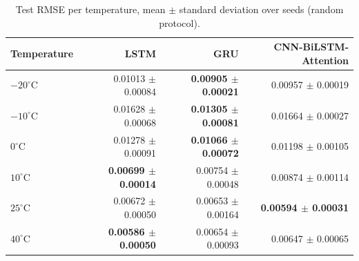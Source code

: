 \begin{table}[t]
\centering
\caption{Test RMSE per temperature, mean $\pm$ standard deviation over seeds (random protocol).}
\label{tab:rmse_temperature_seeds_random}
\begin{tabular}{lrrr}
\toprule
Temperature & LSTM & GRU & CNN-BiLSTM-Attention \\
\midrule
$-20^{\circ}$C & 0.01013 $\pm$ 0.00084 & \textbf{0.00905 $\pm$ 0.00021} & 0.00957 $\pm$ 0.00019 \\
$-10^{\circ}$C & 0.01628 $\pm$ 0.00068 & \textbf{0.01305 $\pm$ 0.00081} & 0.01664 $\pm$ 0.00027 \\
$0^{\circ}$C & 0.01278 $\pm$ 0.00091 & \textbf{0.01066 $\pm$ 0.00072} & 0.01198 $\pm$ 0.00105 \\
$10^{\circ}$C & \textbf{0.00699 $\pm$ 0.00014} & 0.00754 $\pm$ 0.00048 & 0.00874 $\pm$ 0.00114 \\
$25^{\circ}$C & 0.00672 $\pm$ 0.00050 & 0.00653 $\pm$ 0.00164 & \textbf{0.00594 $\pm$ 0.00031} \\
$40^{\circ}$C & \textbf{0.00586 $\pm$ 0.00050} & 0.00654 $\pm$ 0.00093 & 0.00647 $\pm$ 0.00065 \\
\bottomrule
\end{tabular}
\end{table}